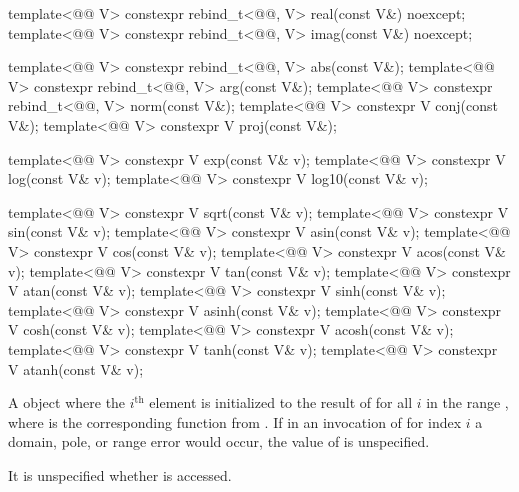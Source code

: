 \begin{itemdecl}
template<@@ V>
  constexpr rebind_t<@@, V> real(const V&) noexcept;
template<@@ V>
  constexpr rebind_t<@@, V> imag(const V&) noexcept;

template<@@ V>
  constexpr rebind_t<@@, V> abs(const V&);
template<@@ V>
  constexpr rebind_t<@@, V> arg(const V&);
template<@@ V>
  constexpr rebind_t<@@, V> norm(const V&);
template<@@ V> constexpr V conj(const V&);
template<@@ V> constexpr V proj(const V&);

template<@@ V> constexpr V exp(const V& v);
template<@@ V> constexpr V log(const V& v);
template<@@ V> constexpr V log10(const V& v);

template<@@ V> constexpr V sqrt(const V& v);
template<@@ V> constexpr V sin(const V& v);
template<@@ V> constexpr V asin(const V& v);
template<@@ V> constexpr V cos(const V& v);
template<@@ V> constexpr V acos(const V& v);
template<@@ V> constexpr V tan(const V& v);
template<@@ V> constexpr V atan(const V& v);
template<@@ V> constexpr V sinh(const V& v);
template<@@ V> constexpr V asinh(const V& v);
template<@@ V> constexpr V cosh(const V& v);
template<@@ V> constexpr V acosh(const V& v);
template<@@ V> constexpr V tanh(const V& v);
template<@@ V> constexpr V atanh(const V& v);
\end{itemdecl}

\begin{itemdescr}
\pnum
\returns
A  object  where the $i^\text{th}$ element is
initialized to the result of  for all
$i$ in the range , where  is the
corresponding function from . If in an invocation of
 for index $i$ a domain, pole, or range error would
occur, the value of  is unspecified.

\pnum
\remarks
It is unspecified whether  is accessed.
\end{itemdescr}

